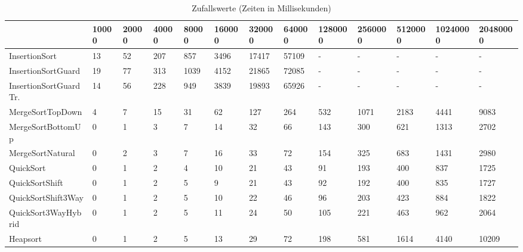 \begin{table}[h]
\begin{tabular}{|l|l|l|l|l|l|l|l|l|l|l|l|l|}
\hline
 & 10000 & 20000 & 40000 & 80000 & 160000 & 320000 & 640000 & 1280000 & 2560000 & 5120000 & 10240000 & 20480000 \\ \hline
InsertionSort & 13 & 52 & 207 & 857 & 3496 & 17417 & 57109 & - & - & - & - & - \\ \hline
InsertionSortGuard & 19 & 77 & 313 & 1039 & 4152 & 21865 & 72085 & - & - & - & - & - \\ \hline
InsertionSortGuardTr. & 14 & 56 & 228 & 949 & 3839 & 19893 & 65926 & - & - & - & - & - \\ \hline
MergeSortTopDown & 4 & 7 & 15 & 31 & 62 & 127 & 264 & 532 & 1071 & 2183 & 4441 & 9083 \\ \hline
MergeSortBottomUp & 0 & 1 & 3 & 7 & 14 & 32 & 66 & 143 & 300 & 621 & 1313 & 2702 \\ \hline
MergeSortNatural & 0 & 2 & 3 & 7 & 16 & 33 & 72 & 154 & 325 & 683 & 1431 & 2980 \\ \hline
QuickSort & 0 & 1 & 2 & 4 & 10 & 21 & 43 & 91 & 193 & 400 & 837 & 1725 \\ \hline
QuickSortShift & 0 & 1 & 2 & 5 & 9 & 21 & 43 & 92 & 192 & 400 & 835 & 1727 \\ \hline
QuickSortShift3Way & 0 & 1 & 2 & 5 & 10 & 22 & 46 & 96 & 203 & 423 & 884 & 1822 \\ \hline
QuickSort3WayHybrid & 0 & 1 & 2 & 5 & 11 & 24 & 50 & 105 & 221 & 463 & 962 & 2064 \\ \hline
Heapsort & 0 & 1 & 2 & 5 & 13 & 29 & 72 & 198 & 581 & 1614 & 4140 & 10209 \\ \hline
\end{tabular}
\caption{Zufallswerte (Zeiten in Millisekunden)}
\end{table}

